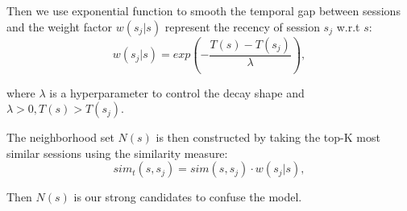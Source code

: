 Then we use exponential function to smooth the temporal gap between sessions and the weight factor $w(s_j|s)$ represent the recency of session $s_j$ w.r.t $s$:
\begin{equation}
    w(s_j|s) = exp(-\frac{T(s)-T(s_j)}{\lambda}),
\end{equation}

where $\lambda$ is a hyperparameter to control the decay shape and  $\lambda>0, T(s) > T(s_j)$.

The neighborhood set $N(s)$ is then constructed by taking the top-K most
similar sessions using the similarity measure:
\begin{equation}
    sim_t(s, s_j) = sim(s, s_j) \cdot w(s_j|s),
\end{equation}

Then $N(s)$ is our strong candidates to confuse the model.